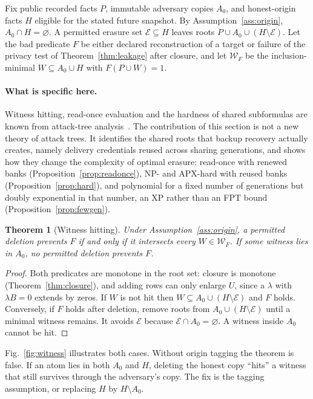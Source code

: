 \documentclass[pdflatex,sn-mathphys-num,twocolumn]{sn-jnl}
\theoremstyle{plain}
\newtheorem{theorem}{Theorem}
\theoremstyle{definition}
\begin{document}
Fix public recorded facts $P$, immutable adversary copies $A_0$, and honest-origin facts $H$ eligible for the stated future snapshot. By Assumption~\ref{ass:origin}, $A_0\cap H=\varnothing$. A permitted erasure set $\mathcal E\subseteq H$ leaves roots $P\cup A_0\cup(H\setminus\mathcal E)$. Let the bad predicate $F$ be either declared reconstruction of a target or failure of the privacy test of Theorem~\ref{thm:leakage} after closure, and let $\mathcal W_F$ be the inclusion-minimal $W\subseteq A_0\cup H$ with $F(P\cup W)=1$.

\paragraph{What is specific here.}
Witness hitting, read-once evaluation and the hardness of shared subformulas are known from attack-tree analysis~\cite{mauw2005,lopuhaa2022}. The contribution of this section is not a new theory of attack trees. It identifies the shared roots that backup recovery actually creates, namely delivery credentials reused across sharing generations, and shows how they change the complexity of optimal erasure: read-once with renewed banks (Proposition~\ref{prop:readonce}), NP- and APX-hard with reused banks (Proposition~\ref{prop:hard}), and polynomial for a fixed number of generations but doubly exponential in that number, an XP rather than an FPT bound (Proposition~\ref{prop:fewgen}).

\begin{theorem}[Witness hitting]\label{thm:cuts}
Under Assumption~\ref{ass:origin}, a permitted deletion prevents $F$ if and only if it intersects every $W\in\mathcal W_F$. If some witness lies in $A_0$, no permitted deletion prevents $F$.
\end{theorem}
\begin{proof}
Both predicates are monotone in the root set: closure is monotone (Theorem~\ref{thm:closure}), and adding rows can only enlarge $U$, since a $\lambda$ with $\lambda B=0$ extends by zeros. If $W$ is not hit then $W\subseteq A_0\cup(H\setminus\mathcal E)$ and $F$ holds. Conversely, if $F$ holds after deletion, remove roots from $A_0\cup(H\setminus\mathcal E)$ until a minimal witness remains. It avoids $\mathcal E$ because $\mathcal E\cap A_0=\varnothing$. A witness inside $A_0$ cannot be hit.
\end{proof}

Fig.~\ref{fig:witness} illustrates both cases. Without origin tagging the theorem is false. If an atom lies in both $A_0$ and $H$, deleting the honest copy ``hits'' a witness that still survives through the adversary's copy. The fix is the tagging assumption, or replacing $H$ by $H\setminus A_0$.
\end{document}
